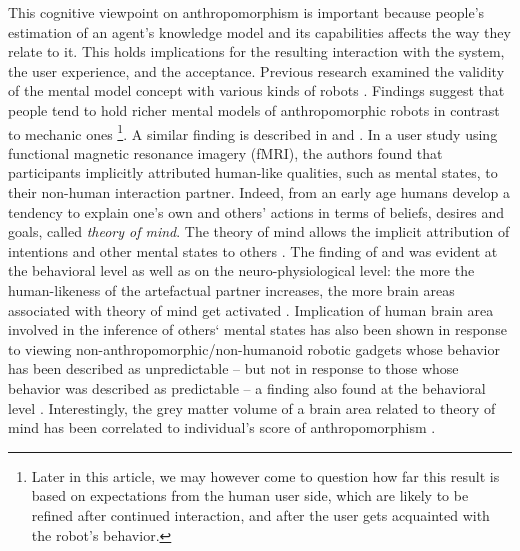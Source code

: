 \documentclass{frontiersSCNS} %
\begin{document}
This cognitive viewpoint on anthropomorphism is important because people's
estimation of an agent's knowledge model and its capabilities affects the way
they relate to it. This holds implications for the resulting interaction with
the system, the user experience, and the acceptance. Previous research examined
the validity of the mental model concept with various kinds of robots
\citep{schmitz_concepts_2011,kiesler_mental_2002}. Findings suggest that people
tend to hold richer mental models of anthropomorphic robots in contrast to
mechanic ones \citep{kiesler_mental_2002}\footnote{Later in this article,
we may however come to question how far this result is based on
expectations from the human user side, which are likely to be refined
after continued interaction, and after the user gets acquainted with the
robot's behavior.}. A similar finding is described in
\cite{hegel_understanding_2008} and \cite{krach_can_2008}. In a user study using
functional magnetic resonance imagery (fMRI), the authors found that
participants implicitly attributed human-like qualities, such as mental states,
to their non-human interaction partner. Indeed, from an early age humans develop
a tendency to explain one's own and others' actions in terms of beliefs, desires
and goals,  called \textit{theory of mind}. The theory of mind allows the
implicit attribution of intentions and other mental states to others
\citep{premack1978does,leslie_pretense_1987,Frith2003}.  The finding of
\cite{hegel_understanding_2008} and \cite{krach_can_2008} was evident at the
behavioral level as well as on the neuro-physiological level: the more the
human-likeness of the artefactual partner increases, the more brain areas
associated with theory of mind  get activated \citep{krach_can_2008}.
Implication of human brain area involved in the inference of others` mental
states has also been shown in response to viewing
non-anthropomorphic/non-humanoid robotic gadgets whose behavior has been
described as unpredictable -- but not in response to those whose behavior was
described as predictable -- a finding also found at the behavioral level
\citep{Waytz2010}.  Interestingly, the grey matter volume of a brain area
related to theory of mind has been correlated to individual's score of
anthropomorphism \citep{cullen2013individual}.
\end{document}
